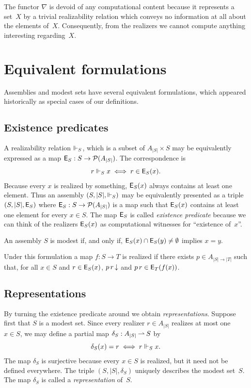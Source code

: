 The functor $\nabla$ is devoid of any computational content because it
represents a set~$X$ by a trivial realizability relation which conveys
no information at all about the elements of~$X$. Consequently, from
the realizers we cannot compute anything interesting regarding~$X$.


\section{Equivalent formulations}
\label{sec:equivalent-formulations}


Assemblies and modest sets have several equivalent formulations, which
appeared historically as special cases of our definitions.


\subsection{Existence predicates}
\label{sec:existence-predicates}

A realizability relation $\Vdash_S$, which is a subset of $A_{|S|} \times
S$ may be equivalently expressed as a map $\mathsf{E}_S : S \to
\mathcal{P}(A_{|S|})$. The correspondence is
%
\begin{equation*}
  r \Vdash_S x \iff r \in \mathsf{E}_S(x).
\end{equation*}
%
Because every $x$ is realized by something, $\mathsf{E}_S(x)$ always contains
at least one element. Thus an assembly $(S, |S|, {\Vdash_S})$ may be
equivalently presented as a triple $(S, |S|, \mathsf{E}_S)$ where $\mathsf{E}_S : S
\to \mathcal{P}(A_{|S|})$ is a map such that $\mathsf{E}_S(x)$ contains at least one
element for every $x \in S$. The map $\mathsf{E}_S$ is called \emph{existence
predicate} because we can think of the realizers $\mathsf{E}_S(x)$ as
computational witnesses for ``existence of~$x$''.

An assembly $S$ is modest if, and only if, $\mathsf{E}_S(x) \cap \mathsf{E}_S(y)
\neq \emptyset$ implies $x = y$.

Under this formulation a map $f : S \to T$ is realized if there exists
$p \in A_{|S| \to |T|}$ such that, for all $x \in S$ and $r \in
\mathsf{E}_S(x)$, $p\,r\,{\downarrow}$ and $p\,r \in \mathsf{E}_T(f(x))$.

\subsection{Representations}
\label{sec:representations}

By turning the existence predicate around we obtain
\emph{representations}. Suppose first that $S$ is a modest set. Since
every realizer $r \in A_{|S|}$ realizes at most one $x \in S$, we may
define a partial map $\delta_S : A_{|S|} \mathbin{\rightharpoonup} S$ by
%
\begin{equation*}
  \delta_S(x) = r \iff r \Vdash_S x.
\end{equation*}
%
The map $\delta_S$ is surjective because every $x \in S$ is realized,
but it need not be defined everywhere. The triple $(S, |S|, \delta_S)$
uniquely describes the modest set~$S$. The map $\delta_S$ is called a
\emph{representation} of~$S$.

